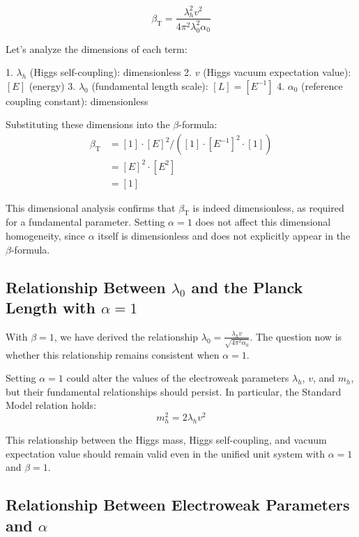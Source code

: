 ﻿\documentclass[12pt,a4paper]{article}
\newcommand{\betaT}{\beta_{\text{T}}}
\begin{document}
	\begin{equation}
		\betaT = \frac{\lambda_h^2 v^2}{4\pi^2 \lambda_0^2 \alpha_0}
	\end{equation}
	
	Let's analyze the dimensions of each term:
	
	1. \(\lambda_h\) (Higgs self-coupling): dimensionless
	2. \(v\) (Higgs vacuum expectation value): \([E]\) (energy)
	3. \(\lambda_0\) (fundamental length scale): \([L] = [E^{-1}]\)
	4. \(\alpha_0\) (reference coupling constant): dimensionless
	
	Substituting these dimensions into the \(\beta\)-formula:
	\begin{align}
		\betaT &= [1] \cdot [E]^2 / ([1] \cdot [E^{-1}]^2 \cdot [1]) \\
		&= [E]^2 \cdot [E^{2}] \\
		&= [1]
	\end{align}
	
	This dimensional analysis confirms that \(\betaT\) is indeed dimensionless, as required for a fundamental parameter. Setting \(\alpha = 1\) does not affect this dimensional homogeneity, since \(\alpha\) itself is dimensionless and does not explicitly appear in the \(\beta\)-formula.
	
	\subsection{Relationship Between \(\lambda_0\) and the Planck Length with \(\alpha = 1\)}
	
	With \(\beta = 1\), we have derived the relationship \(\lambda_0 = \frac{\lambda_h v}{\sqrt{4\pi^2 \alpha_0}}\). The question now is whether this relationship remains consistent when \(\alpha = 1\).
	
	Setting \(\alpha = 1\) could alter the values of the electroweak parameters \(\lambda_h\), \(v\), and \(m_h\), but their fundamental relationships should persist. In particular, the Standard Model relation holds:
	\begin{equation}
		m_h^2 = 2\lambda_h v^2
	\end{equation}
	
	This relationship between the Higgs mass, Higgs self-coupling, and vacuum expectation value should remain valid even in the unified unit system with \(\alpha = 1\) and \(\beta = 1\).
	
	\subsection{Relationship Between Electroweak Parameters and \(\alpha\)}
	
\end{document}
